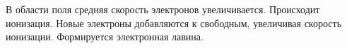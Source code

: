 \documentclass{beamer}
\begin{document}
\begin{frame}
\begin{columns}
			В области поля средняя скорость электронов увеличивается. Происходит ионизация. Новые электроны добавляются к свободным, увеличивая скорость ионизации. Формируется электронная лавина.
			
		\end{columns}		
		
		
		
	\end{frame}
\end{document}

